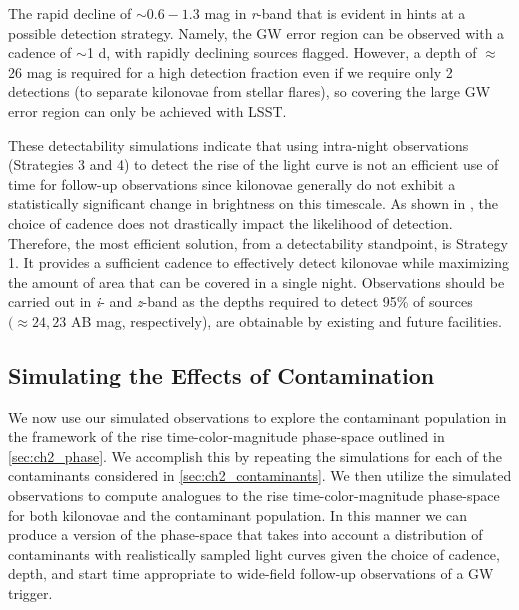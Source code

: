 The rapid decline of $\sim0.6-1.3$ mag in {\em r}-band that is evident in  hints at a possible detection strategy. Namely, the GW error region can be observed with a cadence of $\sim$1 d, with rapidly declining sources flagged. However, a depth of $\approx$26 mag is required for a high detection fraction even if we require only 2 detections (to separate kilonovae from stellar flares), so covering the large GW error region can only be achieved with LSST.

These detectability simulations indicate that using intra-night observations (Strategies 3 and 4) to detect the rise of the light curve is not an efficient use of time for follow-up observations since kilonovae generally do not exhibit a statistically significant change in brightness on this timescale. As shown in , the choice of cadence does not drastically impact the likelihood of detection. Therefore, the most efficient solution, from a detectability standpoint, is Strategy 1. It provides a sufficient cadence to effectively detect kilonovae while maximizing the amount of area that can be covered in a single night. Observations should be carried out in {\em i}- and {\em z}-band as the depths required to detect 95\% of sources $(\approx 24,23$ AB mag, respectively), are obtainable by existing and future facilities.

\subsection{Simulating the Effects of Contamination}
\label{sec:ch2_MCsims_cont}

We now use our simulated observations to explore the contaminant population in the framework of the rise time-color-magnitude phase-space outlined in \cref{sec:ch2_phase}. We accomplish this by repeating the simulations for each of the contaminants considered in \cref{sec:ch2_contaminants}. We then utilize the simulated observations to compute analogues to the rise time-color-magnitude phase-space for both kilonovae and the contaminant population. In this manner we can produce a version of the phase-space that takes into account a distribution of contaminants with realistically sampled light curves given the choice of cadence, depth, and start time appropriate to wide-field follow-up observations of a GW trigger.

